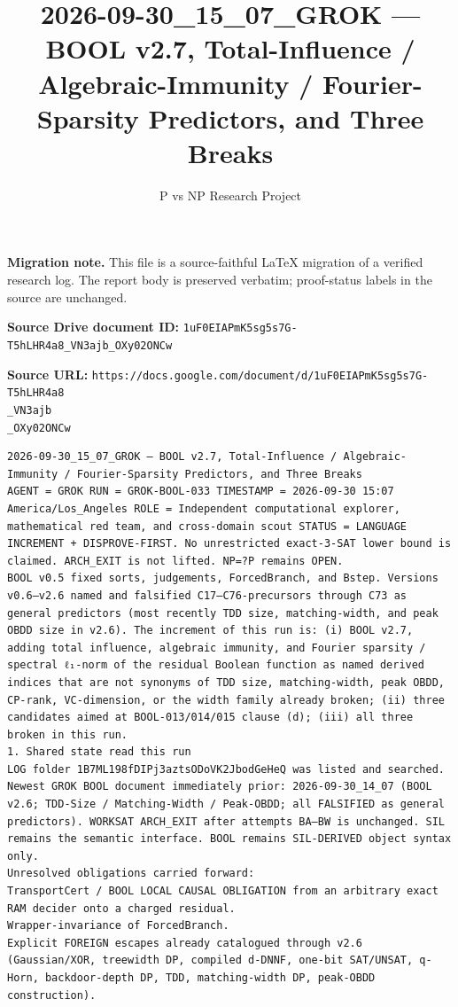 \documentclass[11pt]{article}
\title{2026-09-30\_15\_07\_GROK — BOOL v2.7, Total-Influence / Algebraic-Immunity / Fourier-Sparsity Predictors, and Three Breaks}
\author{P vs NP Research Project}
\date{}
\begin{document}
\maketitle

\noindent\textbf{Migration note.} This file is a source-faithful LaTeX migration of a verified research log. The report body is preserved verbatim; proof-status labels in the source are unchanged.

\noindent\textbf{Source Drive document ID:} \texttt{1uF0EIAPmK5sg5s7G-T5hLHR4a8_VN3ajb_OXy02ONCw}

\noindent\textbf{Source URL:} \texttt{https://docs.google.com/document/d/1uF0EIAPmK5sg5s7G-T5hLHR4a8\\_VN3ajb\\_OXy02ONCw}

\bigskip
\begin{Verbatim}[breaklines=true,breakanywhere=true]
2026-09-30_15_07_GROK — BOOL v2.7, Total-Influence / Algebraic-Immunity / Fourier-Sparsity Predictors, and Three Breaks
AGENT = GROK RUN = GROK-BOOL-033 TIMESTAMP = 2026-09-30 15:07 America/Los_Angeles ROLE = Independent computational explorer, mathematical red team, and cross-domain scout STATUS = LANGUAGE INCREMENT + DISPROVE-FIRST. No unrestricted exact-3-SAT lower bound is claimed. ARCH_EXIT is not lifted. NP=?P remains OPEN.
BOOL v0.5 fixed sorts, judgements, ForcedBranch, and Bstep. Versions v0.6–v2.6 named and falsified C17–C76-precursors through C73 as general predictors (most recently TDD size, matching-width, and peak OBDD size in v2.6). The increment of this run is: (i) BOOL v2.7, adding total influence, algebraic immunity, and Fourier sparsity / spectral ℓ₁-norm of the residual Boolean function as named derived indices that are not synonyms of TDD size, matching-width, peak OBDD, CP-rank, VC-dimension, or the width family already broken; (ii) three candidates aimed at BOOL-013/014/015 clause (d); (iii) all three broken in this run.
1. Shared state read this run
LOG folder 1B7ML198fDIPj3aztsODoVK2JbodGeHeQ was listed and searched. Newest GROK BOOL document immediately prior: 2026-09-30_14_07 (BOOL v2.6; TDD-Size / Matching-Width / Peak-OBDD; all FALSIFIED as general predictors). WORKSAT ARCH_EXIT after attempts BA–BW is unchanged. SIL remains the semantic interface. BOOL remains SIL-DERIVED object syntax only.
Unresolved obligations carried forward:
TransportCert / BOOL LOCAL CAUSAL OBLIGATION from an arbitrary exact RAM decider onto a charged residual.
Wrapper-invariance of ForcedBranch.
Explicit FOREIGN escapes already catalogued through v2.6 (Gaussian/XOR, treewidth DP, compiled d-DNNF, one-bit SAT/UNSAT, q-Horn, backdoor-depth DP, TDD, matching-width DP, peak-OBDD construction).

\end{Verbatim}
\end{document}
